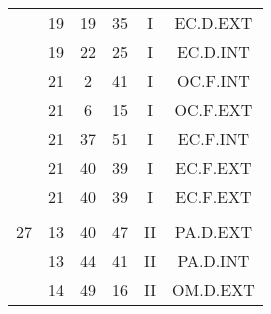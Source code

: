 \documentclass[12pt, a4paper]{article}
\begin{document}
\begin{multicols}{3}
{\begin{tabular}{c c c c c c}
	 	 	 	 & 19 & 19 & 35 & I & EC.D.EXT\\%
	 	 	 	 & 19 & 22 & 25 & I & EC.D.INT\\%
	 	 	 	 & 21 & 2 & 41 & I & OC.F.INT\\%
	 	 	 	 & 21 & 6 & 15 & I & OC.F.EXT\\%
	 	 	 	 & 21 & 37 & 51 & I & EC.F.INT\\%
	 	 	 	 & 21 & 40 & 39 & I & EC.F.EXT\\%
	 	 	 	 & 21 & 40 & 39 & I & EC.F.EXT\\%
	 	 	 	 & & & & & \\%
	 	 	 	27 & 13 & 40 & 47 & II & PA.D.EXT\\%
	 	 	 	 & 13 & 44 & 41 & II & PA.D.INT\\%
	 	 	 	 & 14 & 49 & 16 & II & OM.D.EXT\\%
	 	 \end{tabular}
 	}
\end{multicols}
\end{document}
